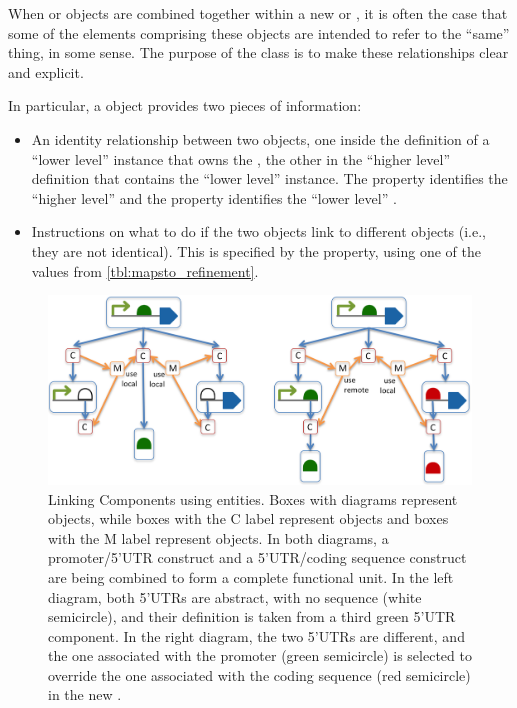 When  or  objects are combined together within a new  or , it is often the case that some of the elements comprising these objects are intended to refer to the ``same'' thing, in some sense.
The purpose of the  class is to make these relationships clear and explicit.

In particular, a  object provides two pieces of information:
\begin{itemize}
\item An identity relationship between two 
  objects, one inside the definition of a ``lower level'' instance that owns the
  , the other in the ``higher level'' definition that
  contains the ``lower level'' instance.  The  property identifies the ``higher
  level''  and the  property
  identifies the ``lower level'' .
\item Instructions on what to do if the two 
  objects link to different  objects (i.e.,
  they are not identical).  This is specified by the 
  property, using one of the values from \ref{tbl:mapsto_refinement}.
\end{itemize}

\begin{figure}[ht]
\begin{center}
\includegraphics[scale=1]{images/MapsTo_Diagram2}
\caption{Linking Components using  entities. Boxes with diagrams represent  objects, while boxes with the C label represent  objects and boxes with the M label represent  objects.  In both diagrams, a promoter/5'UTR construct and a 5'UTR/coding sequence construct are being combined to form a complete functional unit.  
In the left diagram, both 5'UTRs are abstract, with no sequence (white semicircle), and their definition is taken from a third green 5'UTR component. In the right diagram, the two 5'UTRs are different, and the one associated with the promoter (green semicircle) is selected to override the one associated with the coding sequence (red semicircle) in the new .}
\label{image:maps_to_diagram2}
\end{center}
\end{figure}

